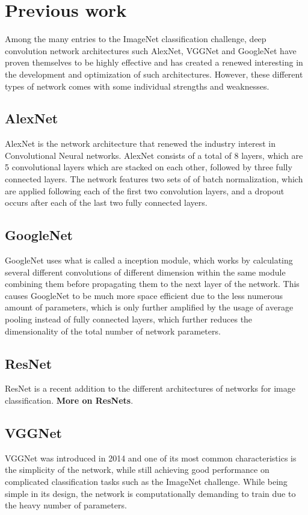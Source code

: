 \documentclass{kthreport}
\begin{document}
\section{Previous work}
Among the many entries to the ImageNet classification challenge, deep convolution network architectures such AlexNet, VGGNet and GoogleNet have proven themselves to be highly effective and has created a renewed interesting in the development and optimization of such architectures. However, these different types of network comes with some individual strengths and weaknesses.



\subsection{AlexNet}
AlexNet is the network architecture that renewed the industry interest in Convolutional Neural networks. AlexNet consists of a total of 8 layers, which are 5 convolutional layers which are stacked on each other, followed by three fully connected layers. The network features two sets of of batch normalization, which are applied following each of the first two convolution layers, and a dropout occurs after each of the last two fully connected layers.
\subsection{GoogleNet}
GoogleNet uses what is called a inception module, which works by calculating several different convolutions of different dimension within the same module combining them before propagating them to the next layer of the network\cite{szegedy2016rethinking}. This causes GoogleNet to be much more space efficient due to the less numerous amount of parameters, which is only further amplified by the usage of average pooling instead of fully connected layers, which further reduces the dimensionality of the total number of network parameters.
\subsection{ResNet}
ResNet is a recent addition to the different architectures of networks for image classification. \textbf{More on ResNets}.


\subsection{VGGNet}
VGGNet was introduced in 2014 and one of its most common characteristics is the simplicity of the network, while still achieving good performance on complicated classification tasks such as the ImageNet challenge\cite{simonyan2014very}. While being simple in its design, the network is computationally demanding to train due to the heavy number of parameters.
\end{document}

